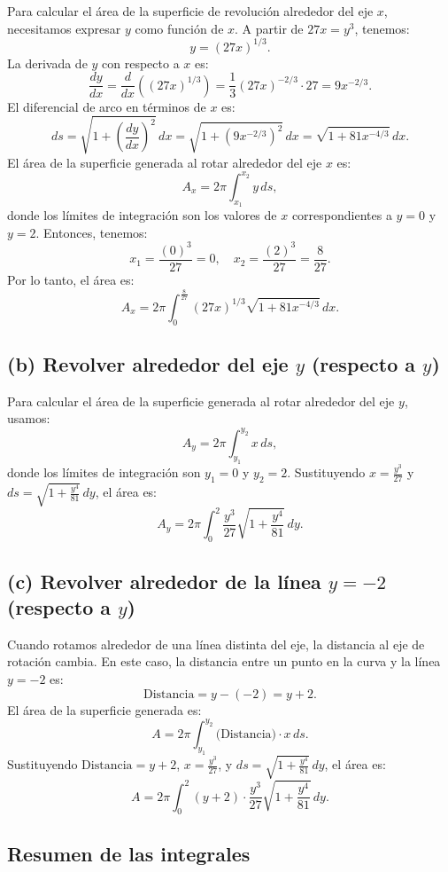 \documentclass[11pt,letterpaper]{article}
\begin{document}
Para calcular el área de la superficie de revolución alrededor del eje \(x\), necesitamos expresar \(y\) como función de \(x\). A partir de \( 27x = y^3 \), tenemos:
\[
y = (27x)^{1/3}.
\]
La derivada de \(y\) con respecto a \(x\) es:
\[
\frac{dy}{dx} = \frac{d}{dx} ((27x)^{1/3}) = \frac{1}{3} (27x)^{-2/3} \cdot 27 = 9x^{-2/3}.
\]
El diferencial de arco en términos de \(x\) es:
\[
ds = \sqrt{1 + \left(\frac{dy}{dx}\right)^2} \, dx = \sqrt{1 + (9x^{-2/3})^2} \, dx = \sqrt{1 + 81x^{-4/3}} \, dx.
\]
El área de la superficie generada al rotar alrededor del eje \(x\) es:
\[
A_x = 2\pi \int_{x_1}^{x_2} y \, ds,
\]
donde los límites de integración son los valores de \(x\) correspondientes a \(y = 0\) y \(y = 2\). Entonces, tenemos:
\[
x_1 = \frac{(0)^3}{27} = 0, \quad x_2 = \frac{(2)^3}{27} = \frac{8}{27}.
\]
Por lo tanto, el área es:
\[
A_x = 2\pi \int_{0}^{\frac{8}{27}} (27x)^{1/3} \sqrt{1 + 81x^{-4/3}} \, dx.
\]

\subsection*{(b) Revolver alrededor del eje \(y\) (respecto a \(y\))}

Para calcular el área de la superficie generada al rotar alrededor del eje \(y\), usamos:
\[
A_y = 2\pi \int_{y_1}^{y_2} x \, ds,
\]
donde los límites de integración son \(y_1 = 0\) y \(y_2 = 2\). Sustituyendo \(x = \frac{y^3}{27}\) y \(ds = \sqrt{1 + \frac{y^4}{81}} \, dy\), el área es:
\[
A_y = 2\pi \int_{0}^{2} \frac{y^3}{27} \sqrt{1 + \frac{y^4}{81}} \, dy.
\]


\subsection*{(c) Revolver alrededor de la línea \(y = -2\) (respecto a \(y\))}

Cuando rotamos alrededor de una línea distinta del eje, la distancia al eje de rotación cambia. En este caso, la distancia entre un punto en la curva y la línea \(y = -2\) es:
\[
\text{Distancia} = y - (-2) = y + 2.
\]
El área de la superficie generada es:
\[
A = 2\pi \int_{y_1}^{y_2} \text{(Distancia)} \cdot x \, ds.
\]
Sustituyendo \(\text{Distancia} = y + 2\), \(x = \frac{y^3}{27}\), y \(ds = \sqrt{1 + \frac{y^4}{81}} \, dy\), el área es:
\[
A = 2\pi \int_{0}^{2} (y + 2) \cdot \frac{y^3}{27} \sqrt{1 + \frac{y^4}{81}} \, dy.
\]

\subsection*{Resumen de las integrales}
\end{document}

